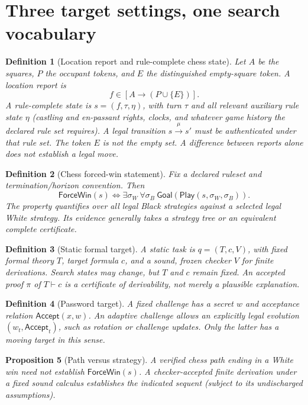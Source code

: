 \documentclass[11pt,letterpaper]{article}
\newtheorem{definition}{Definition}[section]
\newtheorem{proposition}[definition]{Proposition}
\theoremstyle{remark}
\newcommand{\Goal}{\mathsf{Goal}}
\begin{document}
\section{Three target settings, one search vocabulary}
\begin{definition}[Location report and rule-complete chess state]\label{def:chess}
Let $A$ be the squares, $P$ the occupant tokens, and $E$ the distinguished empty-square token. A location report is
\[ f\in[A\to(P\cup\{E\})]. \]
A rule-complete state is $s=(f,\tau,\eta)$, with turn $\tau$ and all relevant auxiliary rule state $\eta$ (castling and en-passant rights, clocks, and whatever game history the declared rule set requires). A legal transition $s\xrightarrow{\mu}s'$ must be authenticated under that rule set. The token $E$ is not the empty set. A difference between reports alone does not establish a legal move.
\end{definition}
\begin{definition}[Chess forced-win statement]
Fix a declared ruleset and termination/horizon convention. Then
\[\mathsf{ForceWin}(s)\iff \exists\sigma_W\ \forall\sigma_B\ \Goal(\mathsf{Play}(s,\sigma_W,\sigma_B)).\]
The property quantifies over all legal Black strategies against a selected legal White strategy. Its evidence generally takes a strategy tree or an equivalent complete certificate.
\end{definition}
\begin{definition}[Static formal target]
A static task is $q=(T,c,V)$, with fixed formal theory $T$, target formula $c$, and a sound, frozen checker $V$ for finite derivations. Search states may change, but $T$ and $c$ remain fixed. An accepted proof $\pi$ of $T\vdash c$ is a certificate of derivability, not merely a plausible explanation.
\end{definition}
\begin{definition}[Password target]
A fixed challenge has a secret $w$ and acceptance relation $\mathsf{Accept}(x,w)$. An adaptive challenge allows an explicitly legal evolution $(w_t,\mathsf{Accept}_t)$, such as rotation or challenge updates. Only the latter has a moving target in this sense.
\end{definition}
\begin{proposition}[Path versus strategy]\label{prop:path}
A verified chess path ending in a White win need not establish $\mathsf{ForceWin}(s)$. A checker-accepted finite derivation under a fixed sound calculus establishes the indicated sequent (subject to its undischarged assumptions).
\end{proposition}
\end{document}
